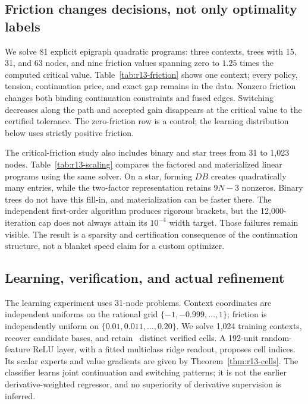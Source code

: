 \subsection{Friction changes decisions, not only optimality labels}
We solve 81 explicit epigraph quadratic programs: three contexts, trees with 15, 31, and 63 nodes, and nine friction values spanning zero to $1.25$ times the computed critical value. Table~\ref{tab:r13-friction} shows one context; every policy, tension, continuation price, and exact gap remains in the data. Nonzero friction changes both binding continuation constraints and fused edges. Switching decreases along the path and accepted gain disappears at the critical value to the certified tolerance. The zero-friction row is a control; the learning distribution below uses strictly positive friction.


The critical-friction study also includes binary and star trees from 31 to 1,023 nodes. Table~\ref{tab:r13-scaling} compares the factored and materialized linear programs using the same solver. On a star, forming $DB$ creates quadratically many entries, while the two-factor representation retains $9N-3$ nonzeros. Binary trees do not have this fill-in, and materialization can be faster there. The independent first-order algorithm produces rigorous brackets, but the 12,000-iteration cap does not always attain its $10^{-4}$ width target. Those failures remain visible. The result is a sparsity and certification consequence of the continuation structure, not a blanket speed claim for a custom optimizer.


\subsection{Learning, verification, and actual refinement}
The learning experiment uses 31-node problems. Context coordinates are independent uniforms on the rational grid $\{-1,-0.999,\ldots,1\}$; friction is independently uniform on $\{0.01,0.011,\ldots,0.20\}$. We solve 1,024 training contexts, recover candidate bases, and retain \RThirteenCells\ distinct verified cells. A 192-unit random-feature ReLU layer, with a fitted multiclass ridge readout, proposes cell indices. Its scalar experts and value gradients are given by Theorem~\ref{thm:r13-cells}. The classifier learns joint continuation and switching patterns; it is not the earlier derivative-weighted regressor, and no superiority of derivative supervision is inferred.

